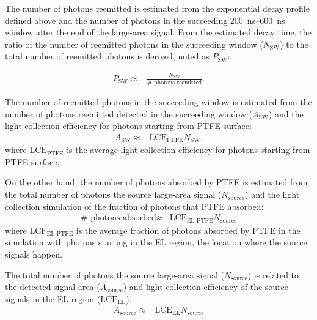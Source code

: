 The number of photons reemitted is estimated from the exponential decay profile defined above and the number of photons in the succeeding \SIrange{200}{600}{\ns} window after the end of the large-area signal. From the estimated decay time, the ratio of the number of reemitted photons in the succeeding window ($N_{\text{SW}}$) to the total number of reemitted photons is derived, noted as $P_{\text{SW}}$: 

\begin{align}
P_{\text{SW}} \approx& \frac{N_{\text{SW}}}{\text{\#\ photons reemitted}}.
\end{align}

The number of reemitted photons in the succeeding window is estimated from the number of photons reemitted detected in the succeeding window ($A_{\text{SW}}$) and the light collection efficiency for photons starting from PTFE surface:  
\begin{align}
A_{\text{SW}} \approx& \text{LCE}_{\text{PTFE}} N_{\text{SW}}. 
\end{align}
where $\text{LCE}_{\text{PTFE}}$ is the average light collection efficiency for photons starting from PTFE surface. 

On the other hand, the number of photons absorbed by PTFE is estimated from the total number of photons the source large-area signal ($N_{\text{source}}$) and the light collection simulation of the fraction of photons that PTFE absorbed:
\begin{align}
\text{\#\ photons absorbed} \approx& \text{LCF}_{\text{EL-PTFE}} N_{\text{source}}
\end{align}
where $\text{LCF}_{\text{EL-PTFE}}$ is the average fraction of photons absorbed by PTFE in the simulation with photons starting in the EL region, the location where the source signals happen. 

The total number of photons the source large-area signal ($N_{\text{source}}$) is related to the detected signal area ($A_{\text{source}}$) and light collection efficiency of the source signals in the EL region ($\text{LCE}_{\text{EL}}$).
\begin{align}
A_{\text{source}} \approx& \text{LCE}_{\text{EL}}  N_{\text{source}}
\end{align}

